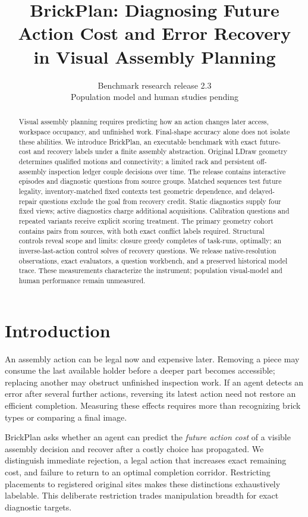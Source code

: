 \documentclass[10pt,twocolumn,letterpaper]{article}
\title{BrickPlan: Diagnosing Future Action Cost and Error Recovery\\in Visual Assembly Planning}
\author{Benchmark research release 2.3\\Population model and human studies pending}
\begin{document}
\raggedbottom
\maketitle

\begin{abstract}
Visual assembly planning requires predicting how an action changes later
access, workspace occupancy, and unfinished work. Final-shape accuracy
alone does not isolate these abilities. We introduce BrickPlan, an
executable benchmark with exact future-cost and recovery labels under
a finite assembly abstraction. Original LDraw geometry determines
qualified motions and connectivity; a limited rack and persistent
off-assembly inspection ledger couple decisions over time.
The release contains \EpisodeCount{} interactive episodes and
\ProbeCount{} diagnostic questions from \SourceCount{} source groups.
Matched sequences test future legality, inventory-matched fixed contexts
test geometric dependence, and delayed-repair questions exclude the goal from
recovery credit. Static diagnostics supply four fixed views; active
diagnostics charge additional acquisitions. Calibration questions and
repeated variants receive explicit scoring treatment.
The primary geometry cohort contains \PrimaryPairCount{} pairs from
\PrimarySourceCount{} sources, with both exact conflict labels required.
Structural controls reveal scope and limits: closure greedy completes
\GreedyCompleted{} of \GreedyAssigned{} task-runs, \GreedyOptimal{} optimally;
an inverse-last-action control solves \InverseAccuracy{} of recovery
questions. We release native-resolution
observations, exact evaluators, a question workbench, and a preserved
historical model trace. These measurements characterize the instrument;
population visual-model and human performance remain unmeasured.
\end{abstract}

\section{Introduction}
An assembly action can be legal now and expensive later. Removing a
piece may consume the last available holder before a deeper part becomes
accessible; replacing another may obstruct unfinished inspection work.
If an agent detects an error after several further actions, reversing
its latest action need not restore an efficient completion.
Measuring these effects requires more than recognizing brick types
or comparing a final image.

BrickPlan asks whether an agent can predict the \emph{future action cost}
of a visible assembly decision and recover after a costly choice has
propagated. We distinguish immediate rejection, a legal action that
increases exact remaining cost, and failure to return to an optimal
completion corridor. Restricting placements to registered original
sites makes these distinctions exhaustively labelable. This deliberate
restriction trades manipulation breadth for exact diagnostic targets.
\end{document}
